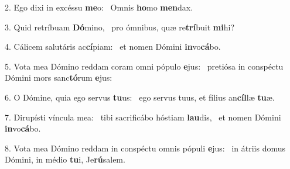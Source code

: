 2. Ego dixi in excéssu \textbf{me}o: \ast\  Omnis \textbf{ho}mo \textbf{men}dax.\

3. Quid retríbuam \textbf{Dó}mino, \ast\  pro ómnibus, quæ re\textbf{trí}buit \textbf{mi}hi?\

4. Cálicem salutáris ac\textbf{cí}piam: \ast\  et nomen Dómini \textbf{in}vo\textbf{cá}bo.\

5. Vota mea Dómino reddam coram omni pópulo \textbf{e}jus: \ast\  pretiósa in conspéctu Dómini mors sanc\textbf{tó}rum \textbf{e}jus:\

6. O Dómine, quia ego servus \textbf{tu}us: \ast\  ego servus tuus, et fílius an\textbf{cíl}læ \textbf{tu}æ.\

7. Dirupísti víncula mea: \dag\  tibi sacrificábo hóstiam \textbf{lau}dis, \ast\  et nomen Dómini \textbf{in}vo\textbf{cá}bo.\

8. Vota mea Dómino reddam in conspéctu omnis pópuli \textbf{e}jus: \ast\  in átriis domus Dómini, in médio \textbf{tu}i, Je\textbf{rú}salem.\

